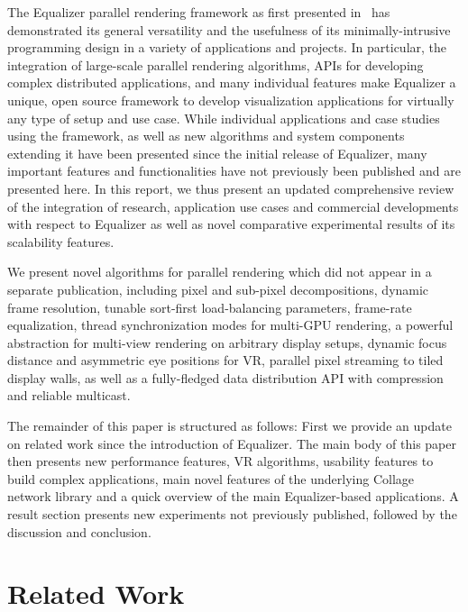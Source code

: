 \documentclass[10pt,journal,compsoc]{IEEEtran}
\begin{document}
The Equalizer parallel rendering framework as first presented in~\cite{EMP:09} has
demonstrated its general versatility and the usefulness of its minimally-intrusive
programming design in a variety of applications and projects.
In particular, the integration of large-scale parallel rendering algorithms,
APIs for developing complex distributed applications, and many
individual features make Equalizer a unique, open source framework to develop
visualization applications for virtually any type of setup and use case.
While individual applications and case studies using the framework, as well as
new algorithms and system components extending it have been presented
since the initial release of Equalizer, many important features and functionalities
have not previously been published and are presented here.
In this report, we thus present an updated comprehensive review of the
integration of research, application use cases and commercial developments
with respect to Equalizer as well as novel comparative experimental results
of its scalability features.

We present novel algorithms for parallel rendering which did not appear in a
separate publication, including pixel and sub-pixel decompositions, dynamic
frame resolution, tunable sort-first load-balancing parameters, frame-rate
equalization, thread synchronization modes for multi-GPU rendering, a powerful
abstraction for multi-view rendering on arbitrary display setups, dynamic focus
distance and asymmetric eye positions for VR, parallel pixel streaming to tiled
display walls, as well as a fully-fledged data distribution API with compression
and reliable multicast.

The remainder of this paper is structured as follows: First we provide an update
on related work since the introduction of \textsf{Equalizer}. The main body of this paper
then presents new performance features, VR algorithms, usability
features to build complex applications, main novel features of the underlying
\textsf{Collage} network library and a quick overview of the main
\textsf{Equalizer}-based applications. A result section presents new experiments
not previously published, followed by the discussion and conclusion.

\section{Related Work}\label{sec:related}
\end{document}
